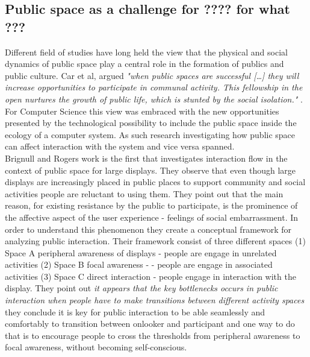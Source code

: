 \subsection{Public space as a challenge for ???? for what ???}
Different field of studies have long held the view that the physical and social dynamics of public space play a central role in the formation of publics and public culture. Car et al, argued \emph{"when public spaces are successful […] they will increase opportunities to participate in communal activity. This fellowship in the open nurtures the growth of public life, which is stunted by the social isolation."} \cite{carr:1992}. For Computer Science this view was embraced with the new opportunities presented by the technological possibility to include the public space inside the ecology of a computer system. As such research investigating how public space can affect interaction with the system and vice versa spanned.\\

Brignull and Rogers work\cite{Brignull:2003} is the first that investigates interaction flow in the context of public space for large displays. They observe that even though large displays are increasingly placed in public places to support community and social activities people are reluctant to using them. They point out that the main reason, for existing resistance by the public to participate, is the prominence of the affective aspect of the  user experience - feelings of social embarrassment. In order to understand this phenomenon they create a conceptual framework for analyzing public interaction. Their framework consist of three different spaces (1) Space A peripheral awareness of displays - people are engage in unrelated activities (2) Space B focal awareness - - people are engage in associated activities (3) Space C direct interaction - people engage in interaction with the display. They point out \emph{it appears that the key bottlenecks occurs in public interaction when people have to make transitions between different activity spaces} they conclude  it is key for public interaction to be able seamlessly and comfortably to transition between onlooker and participant and one way to do that is to encourage people to cross the thresholds from peripheral awareness to focal awareness, without becoming self-conscious.\\

